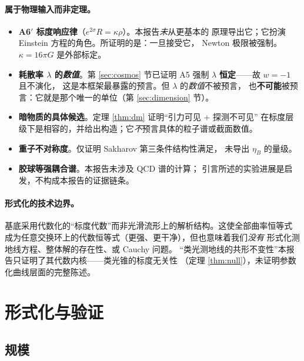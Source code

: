 \documentclass[11pt,a4paper]{article}
\theoremstyle{sudef}
\begin{document}
\paragraph{属于物理输入而非定理。}
\begin{itemize}[leftmargin=1.6em]
\item \textbf{A6$'$ 标度响应律}（$e^{2\sigma}R=\kappa\rho$）。本报告\emph{未}从更基本的
      原理导出它；它扮演 Einstein 方程的角色。所证明的是：一旦接受它，
      Newton 极限被强制。$\kappa=16\pi G$ 是外部标定。

\item \textbf{耗散率 $\lambda$ 的\emph{数值}}。第 \ref{sec:cosmos} 节已证明
      A5 强制 $\lambda$ \textbf{恒定}——故 $w=-1$ 且不演化，
      这是本框架最暴露的预言。但 $\lambda$ 的\emph{数值}不被预言，
      也\textbf{不可能}被预言：它就是那个唯一的单位（第 \ref{sec:dimension} 节）。
\item \textbf{暗物质的具体候选}。定理 \ref{thm:dm} 证明“引力可见 $+$ 探测不可见”
      在标度层级下是相容的，并给出构造；它\emph{不}预言具体的粒子谱或截面数值。
\item \textbf{重子不对称度}。仅证明 Sakharov 第三条件结构性满足，
      未导出 $\eta_B$ 的量级。
\item \textbf{胶球等强耦合谱}。本报告未涉及 QCD 谱的计算；
      引言所述的实验进展是启发，不构成本报告的证据链条。
\end{itemize}

\paragraph{形式化的技术边界。}
基底采用代数化的“标度代数”而非光滑流形上的解析结构。这使全部曲率恒等式
成为任意交换环上的代数恒等式（更强、更干净），但也意味着我们\emph{没有}
形式化测地线方程、整体解的存在性、或 Cauchy 问题。
“类光测地线的共形不变性”本报告只证明了其代数内核——类光锥的标度无关性
（定理 \ref{thm:null}），未证明参数化曲线层面的完整陈述。

\section{形式化与验证}

\subsection{规模}
\end{document}

